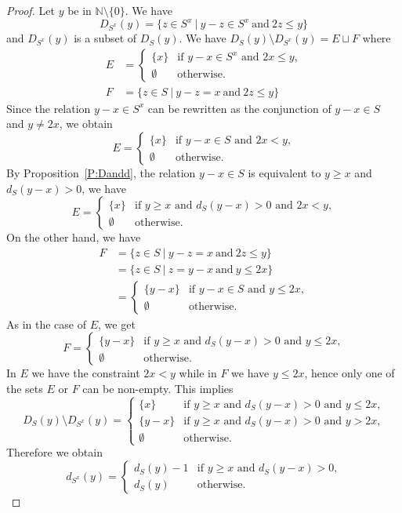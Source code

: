 \documentclass[reqno,11pt]{amsart}
\theoremstyle{plain}
\theoremstyle{definition}
\renewcommand{\leq}{\leqslant}
\renewcommand{\geq}{\geqslant}
\newcommand{\NN}{\mathbb{N}}
\begin{document}
\begin{proof}
Let $y$ be in $\NN\setminus\{0\}$. We have 
\[
D_{S^x}(y)=\{z \in S^x\ |\ y-z\in S^x\ \text{and}\  2z\leq y\}
\]
and $D_{S^x}(y)$ is a subset of $D_S(y)$.
We have $D_S(y)\setminus D_{S^x}(y)=E\sqcup F$ where
\begin{align*}
E&=\begin{cases}
\{x\} &\text{if $y-x\in S^x$ and $2x\leq y$,}\\
\emptyset & \text{otherwise.}
\end{cases}\\
F&=\{z\in S\ |\ y-z=x\ \text{and}\ 2z\leq y\}
\end{align*}
Since  the relation $y-x\in S^x$ can be rewritten as the conjunction of $y-x\in S$ and $y\not=2x$, we obtain
\[
E=\begin{cases}
\{x\} &\text{if $y-x\in S$ and $2x< y$,}\\
\emptyset & \text{otherwise.}
\end{cases}
\]
By Proposition~\ref{P:Dandd}, the relation $y-x\in S$ is equivalent to $y\geq x$ and $d_S(y-x)>0$, we have
\[
E=\begin{cases}
\{x\} &\text{if $y\geq x$ and $d_S(y-x)>0$ and $2x< y$,}\\
\emptyset & \text{otherwise.}
\end{cases}
\]
On the other hand, we have 
\begin{align*}
F&=\{z\in S\ |\ y-z=x\ \text{and}\ 2z\leq y\}\\
&=\{z\in S\ |\ z=y-x\ \text{and}\ y\leq 2x\}\\
&=\begin{cases}
\{y-x\} & \text{if $y-x\in S$ and $y\leq 2x$,}\\
\emptyset & \text{otherwise.}
\end{cases}
\end{align*}
As in the case of $E$, we get 
\[
F=\begin{cases}
\{y-x\} & \text{if $y\geq x$ and $d_S(y-x)>0$ and $y\leq 2x$,}\\
\emptyset & \text{otherwise.}
\end{cases}
\]
In $E$ we have the constraint $2x<y$ while in $F$ we have $y\leq 2x$, hence only one of the sets $E$ or $F$ can be non-empty. 
This implies
\[
D_S(y)\setminus D_{S^x}(y)=
\begin{cases}
\{x\} & \text{if $y\geq x$ and $d_S(y-x)>0$ and $y\leq 2x$,}\\
\{y-x\} & \text{if $y\geq x$ and $d_S(y-x)>0$ and $y>2x$,}\\
\emptyset & \text{otherwise.}
\end{cases}
\]
Therefore we obtain
\[
d_{S^x}(y)=\begin{cases}
d_S(y)-1&\text{if $y\geq x$ and $d_S(y-x)>0$,}\\
d_S(y)& \text{otherwise.}
\end{cases}
\]
\end{proof}
\end{document}
